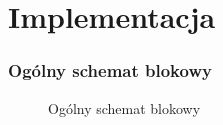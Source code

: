 \section{Implementacja}

\subsubsection{Ogólny schemat blokowy}
\begin{figure}[!ht]
	\caption{\label{fig:flow_chart}Ogólny schemat blokowy}
\end{figure}
\clearpage

